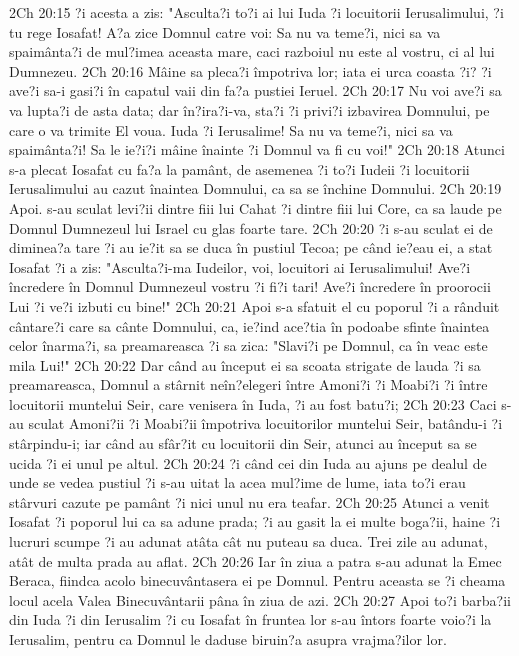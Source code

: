 2Ch 20:15  ?i acesta a zis: "Asculta?i to?i ai lui Iuda ?i locuitorii Ierusalimului, ?i tu rege Iosafat! A?a zice Domnul catre voi: Sa nu va teme?i, nici sa va spaimânta?i de mul?imea aceasta mare, caci razboiul nu este al vostru, ci al lui Dumnezeu.
2Ch 20:16  Mâine sa pleca?i împotriva lor; iata ei urca coasta ?i? ?i ave?i sa-i gasi?i în capatul vaii din fa?a pustiei Ieruel.
2Ch 20:17  Nu voi ave?i sa va lupta?i de asta data; dar în?ira?i-va, sta?i ?i privi?i izbavirea Domnului, pe care o va trimite El voua. Iuda ?i Ierusalime! Sa nu va teme?i, nici sa va spaimânta?i! Sa le ie?i?i mâine înainte ?i Domnul va fi cu voi!"
2Ch 20:18  Atunci s-a plecat Iosafat cu fa?a la pamânt, de asemenea ?i to?i Iudeii ?i locuitorii Ierusalimului au cazut înaintea Domnului, ca sa se închine Domnului.
2Ch 20:19  Apoi. s-au sculat levi?ii dintre fiii lui Cahat ?i dintre fiii lui Core, ca sa laude pe Domnul Dumnezeul lui Israel cu glas foarte tare.
2Ch 20:20  ?i s-au sculat ei de diminea?a tare ?i au ie?it sa se duca în pustiul Tecoa; pe când ie?eau ei, a stat Iosafat ?i a zis: "Asculta?i-ma Iudeilor, voi, locuitori ai Ierusalimului! Ave?i încredere în Domnul Dumnezeul vostru ?i fi?i tari! Ave?i încredere în proorocii Lui ?i ve?i izbuti cu bine!"
2Ch 20:21  Apoi s-a sfatuit el cu poporul ?i a rânduit cântare?i care sa cânte Domnului, ca, ie?ind ace?tia în podoabe sfinte înaintea celor înarma?i, sa preamareasca ?i sa zica: "Slavi?i pe Domnul, ca în veac este mila Lui!"
2Ch 20:22  Dar când au început ei sa scoata strigate de lauda ?i sa preamareasca, Domnul a stârnit neîn?elegeri între Amoni?i ?i Moabi?i ?i între locuitorii muntelui Seir, care venisera în Iuda, ?i au fost batu?i;
2Ch 20:23  Caci s-au sculat Amoni?ii ?i Moabi?ii împotriva locuitorilor muntelui Seir, batându-i ?i stârpindu-i; iar când au sfâr?it cu locuitorii din Seir, atunci au început sa se ucida ?i ei unul pe altul.
2Ch 20:24  ?i când cei din Iuda au ajuns pe dealul de unde se vedea pustiul ?i s-au uitat la acea mul?ime de lume, iata to?i erau stârvuri cazute pe pamânt ?i nici unul nu era teafar.
2Ch 20:25  Atunci a venit Iosafat ?i poporul lui ca sa adune prada; ?i au gasit la ei multe boga?ii, haine ?i lucruri scumpe ?i au adunat atâta cât nu puteau sa duca. Trei zile au adunat, atât de multa prada au aflat.
2Ch 20:26  Iar în ziua a patra s-au adunat la Emec Beraca, fiindca acolo binecuvântasera ei pe Domnul. Pentru aceasta se ?i cheama locul acela Valea Binecuvântarii pâna în ziua de azi.
2Ch 20:27  Apoi to?i barba?ii din Iuda ?i din Ierusalim ?i cu Iosafat în fruntea lor s-au întors foarte voio?i la Ierusalim, pentru ca Domnul le daduse biruin?a asupra vrajma?ilor lor.

